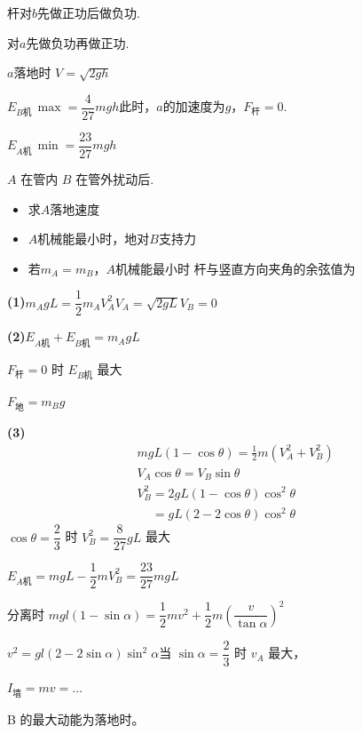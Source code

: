 \begin{problem}[4、]
\begin{solution}
杆对$b$先做正功后做负功.

对$a$先做负功再做正功.

$a$落地时 $V=\sqrt{2gh}$

$E_{B\text{机}}\,\max=\dfrac{4}{27}mgh$\quad 此时，$a$的加速度为$g$，$F_{\text{杆}}=0$.

$E_{A\text{机}}\,\min=\dfrac{23}{27}mgh$
\end{solution}
\end{problem}

\begin{problem}[3、]
$A$ 在管内 $B$ 在管外\quad 扰动后.
\begin{itemize}
\item[(1)] 求$A$落地速度
\item[(2)] $A$机械能最小时，地对$B$支持力
\item[(3)] 若$m_A=m_B$，$A$机械能最小时 杆与竖直方向夹角的余弦值为
\end{itemize}
\begin{solution}
\textbf{(1)}\quad $m_AgL=\dfrac{1}{2}m_AV_A^{2}$\quad $V_A=\sqrt{2gL}$\quad $V_B=0$

\textbf{(2)}\quad $E_{A\text{机}}+E_{B\text{机}}=m_AgL$

$F_{\text{杆}}=0$ 时 $E_{B\text{机}}$ 最大

$F_{\text{地}}=m_Bg$


\textbf{(3)}
\begin{align*}
&mgL(1-\cos\theta)=\frac{1}{2}m(V_A^{2}+V_B^{2})\\
&V_A\cos\theta=V_B\sin\theta\\
&V_B^{2}=2gL(1-\cos\theta)\cos^{2}\theta\\
&\phantom{V_B^{2}}=gL(2-2\cos\theta)\cos^{2}\theta
\end{align*}
$\cos\theta=\dfrac{2}{3}$ 时 $V_B^{2}=\dfrac{8}{27}gL$ 最大

$E_{A\text{机}}=mgL-\dfrac{1}{2}mV_B^{2}=\dfrac{23}{27}mgL$
\end{solution}
\end{problem}

\begin{problem}[3]

\begin{solution}
分离时 $mgl(1-\sin\alpha)=\dfrac{1}{2}mv^2+\dfrac{1}{2}m\left(\dfrac{v}{\tan\alpha}\right)^2$

$v^2=gl(2-2\sin\alpha)\sin^2\alpha$\quad 当 $\sin\alpha=\dfrac{2}{3}$ 时 $v_A$ 最大，

$I_{\text{墙}}=mv=\ldots$

B 的最大动能为落地时。
\end{solution}
\end{problem}


